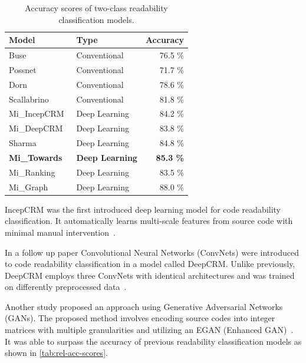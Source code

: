 \documentclass[%
class=scrreprt,
chapterprefix=false,%
open=right,%
twoside=false,%
paper=a4,%
logofile={Logo\_zentral\_farbig\_EN.png},%
thesistype=master,%
UKenglish,%
]{se2thesis}
\theoremstyle{definition}
\begin{document}
	\begin{table}[tb]
		\centering
		\caption{Accuracy scores of two-class readability classification models.}
		\label{tab:rel-acc-scores}
		\begin{tabular}{llr}
			\toprule
			Model & Type & Accuracy \\
			\midrule
			Buse~\cite{buse2009learning} & Conventional & 76.5 \% \\
			Possnet~\cite{posnett2011simpler} & Conventional & 71.7 \% \\
			Dorn~\cite{dorn2012general} & Conventional & 78.6 \% \\
			Scallabrino~\cite{scalabrino2018comprehensive} & Conventional & 81.8 \% \\
			Mi\_IncepCRM~\cite{mi2018inception} & Deep Learning & 84.2 \% \\
			Mi\_DeepCRM~\cite{mi2018improving} & Deep Learning & 83.8 \% \\
			Sharma~\cite{sharma2020egan} & Deep Learning & 84.8 \% \\
			\textbf{Mi\_Towards~\cite{mi2022towards}} & \textbf{Deep Learning} & \textbf{85.3 \%} \\
			Mi\_Ranking~\cite{mi2022rank} & Deep Learning & 83.5 \% \\
			Mi\_Graph~\cite{mi2023graph} & Deep Learning & 88.0 \% \\
			\bottomrule
		\end{tabular}
	\end{table}
	
	IncepCRM was the first introduced deep learning model for code readability classification. It automatically learns multi-scale features from source code with minimal manual intervention~\cite{mi2018inception}.
	
	In a follow up paper Convolutional Neural Networks (ConvNets) were introduced to code readability classification in a model called DeepCRM. Unlike previously, DeepCRM employs three ConvNets with identical architectures and was trained on differently preprocessed data~\cite{mi2018improving}.
		
	Another study proposed an approach using Generative Adversarial Networks (GANs). The proposed method involves encoding source codes into integer matrices with multiple granularities and utilizing an EGAN (Enhanced GAN)~\cite{sharma2020egan}. It was able to surpass the accuracy of previous readability classification models as shown in \autoref{tab:rel-acc-scores}.
	
\end{document}
